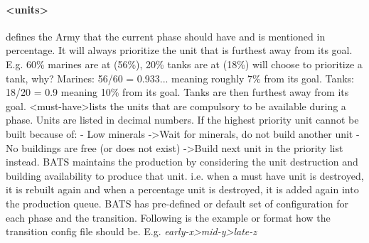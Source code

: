\paragraph{\textless units\textgreater} defines the Army that the current phase should have and is mentioned in percentage.
It will always prioritize the unit that is furthest away from its goal.\newline\newline
E.g. 60\% marines are at (56\%), 20\% tanks are at (18\%) will choose to prioritize a tank, why?\newline
Marines: 56/60 = 0.933... meaning roughly 7\% from its goal.\newline
Tanks: 18/20 = 0.9 meaning 10\% from its goal.\newline
Tanks are then furthest away from its goal.\newline
\textless must-have\textgreater lists the units that are compulsory to be available during a phase. Units are listed in decimal numbers. If the highest priority unit cannot be built because of:\newline
- Low minerals -\textgreater Wait for minerals, do not build another unit\newline
- No buildings are free (or does not exist) -\textgreater Build next unit in the priority list instead.\newline
BATS maintains the production by considering the unit destruction and building availability to produce that unit. i.e. when a must have unit is destroyed, it is rebuilt again and when a percentage unit is destroyed, it is added again into the production queue.\newline
BATS has pre-defined or default set of configuration for each phase and the transition.\newline 
Following is the example or format how the transition config file should be.\newline
E.g. {\it early-x\textgreater mid-y\textgreater late-z\newline}
